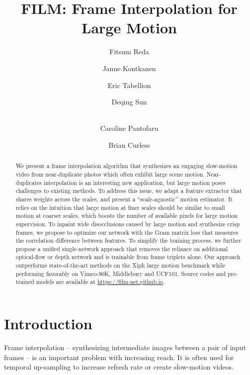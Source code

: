 \documentclass[runningheads]{llncs}
\begin{document}

\pagestyle{headings}
\mainmatter
\def\ECCVSubNumber{4614}  

\title{FILM: Frame Interpolation for Large Motion} 


\author{Fitsum Reda \and
Janne Kontkanen \and
Eric Tabellion \and
Deqing Sun \and \\
Caroline Pantofaru \and
Brian Curless}
\maketitle
\begin{abstract}
We present a frame interpolation algorithm that synthesizes an engaging slow-motion video from near-duplicate photos which often exhibit large scene motion. Near-duplicates interpolation is an interesting new application, but large motion poses challenges to existing methods. To address this issue, we adapt a feature extractor that shares weights across the scales, and present a ``scale-agnostic'' motion estimator. It relies on the intuition that large motion at finer scales should be similar to small motion at coarser scales, which boosts the number of available pixels for large motion supervision. To inpaint wide disocclusions caused by large motion and synthesize crisp frames, we propose to optimize our network with the Gram matrix loss that measures the correlation difference between features. To simplify the training process, we further propose a unified single-network approach that removes the reliance on additional optical-flow or depth network and is trainable from frame triplets alone. Our approach outperforms state-of-the-art methods on the Xiph large motion benchmark while performing favorably on Vimeo-90K, Middlebury and UCF101. Source codes and pre-trained models are available at \url{https://film-net.github.io}.

\end{abstract}


\section{Introduction}
\label{sec:intro}
Frame interpolation -- synthesizing intermediate images between a pair of input frames -- is an important problem with increasing reach. It is often used for temporal up-sampling to increase refresh rate or create slow-motion videos.
\end{document}
